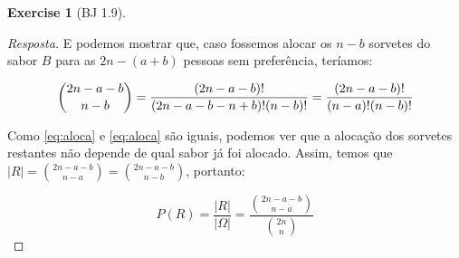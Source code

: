 \documentclass[
]{article}
\theoremstyle{definition}
\theoremstyle{definition}
\theoremstyle{definition}
\newtheorem{exercise}{Exercise}[section]
\theoremstyle{definition}
\theoremstyle{remark}
\begin{document}
\begin{exercise}[BJ 1.9]
\begin{proof}[Resposta]
E podemos mostrar que, caso fossemos alocar os \(n-b\) sorvetes do sabor \(B\) para as \(2n-(a+b)\) pessoas sem preferência, teríamos:

\begin{equation}
\binom{2n-a-b}{n-b} = \frac{(2n-a-b)!}{(2n-a-b-n+b)!(n-b)!} = \frac{(2n-a-b)!}{(n-a)!(n-b)!}\\
\label{eq:alocb}
\end{equation}

Como \eqref{eq:aloca} e \eqref{eq:aloca} são iguais, podemos ver que a alocação dos sorvetes restantes não depende de qual sabor já foi alocado. Assim, temos que \(|R| = \binom{2n-a-b}{n-a} = \binom{2n-a-b}{n-b}\), portanto:

\begin{equation*}
P(R) = \frac{|R|}{|\Omega|} = \frac{\binom{2n-a-b}{n-a}}{\binom{2n}{n}}
\end{equation*}
\end{proof}

\end{exercise}
\end{document}
